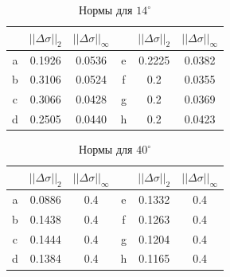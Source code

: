 \documentclass{procDDs}
\begin{document}
\begin{table}[h!]
	\begin{tabular}{|c|c|c||c|c|c|}
		\hline
		& $||\Delta\sigma||_2$ & $||\Delta\sigma||_\infty$ &
		& $||\Delta\sigma||_2$ & $||\Delta\sigma||_\infty$ \\ \hline
		a & 0.1926 & 0.0536 & e &  0.2225 & 0.0382\\ \hline
		b & 0.3106 & 0.0524 & f &  0.2 & 0.0355\\ \hline
		c & 0.3066 & 0.0428 & g &  0.2 & 0.0369\\ \hline
		d & 0.2505 & 0.0440 & h &  0.2 & 0.0423\\ \hline
	\end{tabular}
	\label{table:desc5}
	\caption{Нормы для $14^\circ$}
\end{table}
\begin{table}[h!]
		\begin{tabular}{|c|c|c||c|c|c|}
			\hline
			& $||\Delta\sigma||_2$ & $||\Delta\sigma||_\infty$ &
			& $||\Delta\sigma||_2$ & $||\Delta\sigma||_\infty$ \\ \hline
			a & 0.0886 & 0.4 & e &  0.1332 & 0.4\\ \hline
			b & 0.1438 & 0.4 & f &  0.1263 & 0.4\\ \hline
			c & 0.1444 & 0.4 & g &  0.1204 & 0.4\\ \hline
			d & 0.1384 & 0.4 & h &  0.1165 & 0.4\\ \hline
	\end{tabular}
	\label{table:desc6}
	\caption{Нормы для $40^\circ$}
\end{table}
 
\end{document}
